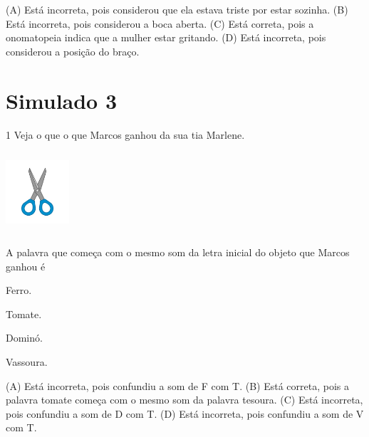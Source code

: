 (A) Está incorreta, pois considerou que ela estava triste por estar sozinha.
(B) Está incorreta, pois considerou a boca aberta.
(C) Está correta, pois a onomatopeia indica que a mulher estar gritando.
(D) Está incorreta, pois considerou a posição do braço.

\chapter{Simulado 3}

\num{1} Veja o que o que Marcos ganhou da sua tia Marlene.

\includegraphics[width=0.92708in,height=1.18125in]{media/image163.jpeg}


A palavra que começa com o mesmo som da letra inicial do objeto que
Marcos ganhou é

\begin{minipage}{.5\textwidth}
\begin{escolha}
\item Ferro.

\item Tomate.

\item Dominó.

\item Vassoura.
\end{escolha}
\end{minipage}

(A) Está incorreta, pois confundiu a som de F com T.
(B) Está correta, pois a palavra tomate começa com o mesmo som da palavra tesoura.
(C) Está incorreta, pois confundiu a som de D com T.
(D) Está incorreta, pois confundiu a som de V com T.

